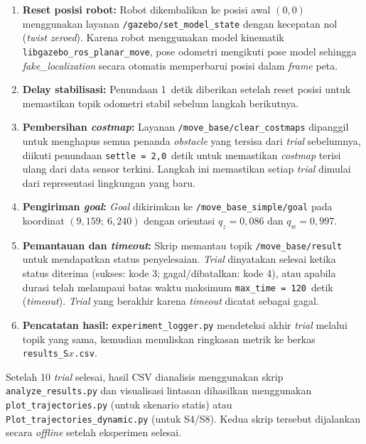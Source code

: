 \begin{enumerate}
    \item \textbf{Reset posisi robot:} Robot dikembalikan ke posisi awal $(0, 0)$ menggunakan layanan \texttt{/gazebo/set\_model\_state} dengan kecepatan nol (\textit{twist zeroed}). Karena robot menggunakan model kinematik \texttt{libgazebo\_ros\_planar\_move}, pose odometri mengikuti pose model sehingga \textit{fake\_localization} secara otomatis memperbarui posisi dalam \textit{frame} peta.

    \item \textbf{Delay stabilisasi:} Penundaan 1~detik diberikan setelah reset posisi untuk memastikan topik odometri stabil sebelum langkah berikutnya.

    \item \textbf{Pembersihan \textit{costmap}:} Layanan \texttt{/move\_base/clear\_costmaps} dipanggil untuk menghapus semua penanda \textit{obstacle} yang tersisa dari \textit{trial} sebelumnya, diikuti penundaan \texttt{settle = 2{,}0}~detik untuk memastikan \textit{costmap} terisi ulang dari data sensor terkini. Langkah ini memastikan setiap \textit{trial} dimulai dari representasi lingkungan yang baru.

    \item \textbf{Pengiriman \textit{goal}:} \textit{Goal} dikirimkan ke \texttt{/move\_base\_simple/goal} pada koordinat $(9{,}159;\ 6{,}240)$ dengan orientasi $q_z = 0{,}086$ dan $q_w = 0{,}997$.

    \item \textbf{Pemantauan dan \textit{timeout}:} Skrip memantau topik \texttt{/move\_base/result} untuk mendapatkan status penyelesaian. \textit{Trial} dinyatakan selesai ketika status diterima (sukses: kode 3; gagal/dibatalkan: kode 4), atau apabila durasi telah melampaui batas waktu maksimum \texttt{max\_time = 120}~detik (\textit{timeout}). \textit{Trial} yang berakhir karena \textit{timeout} dicatat sebagai gagal.

    \item \textbf{Pencatatan hasil:} \texttt{experiment\_logger.py} mendeteksi akhir \textit{trial} melalui topik yang sama, kemudian menuliskan ringkasan metrik ke berkas \texttt{results\_S$x$.csv}.
\end{enumerate}

Setelah 10 \textit{trial} selesai, hasil CSV dianalisis menggunakan skrip \texttt{analyze\_results.py} dan visualisasi lintasan dihasilkan menggunakan \texttt{plot\_trajectories.py} (untuk skenario statis) atau \texttt{Plot\_trajectories\_dynamic.py} (untuk S4/S8). Kedua skrip tersebut dijalankan secara \textit{offline} setelah eksperimen selesai.

